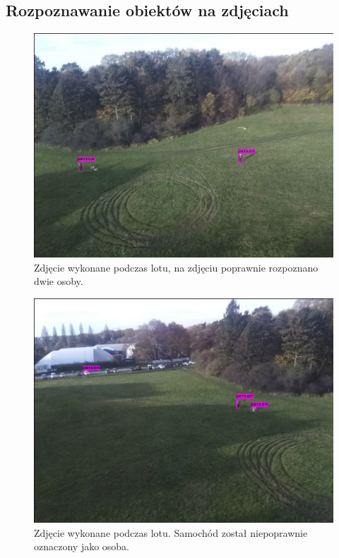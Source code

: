 \subsection{Rozpoznawanie obiektów na zdjęciach}
\begin{multicols}{2}
    
\begin{figure}[H]
	\centering
	\includegraphics[width=\linewidth]{rys05/correctly_recognised_2_ppl.jpg}
    \caption{
        Zdjęcie wykonane podczas lotu, na zdjęciu poprawnie rozpoznano dwie osoby.
    }
	\label{final_ai_good}
\end{figure}

\begin{figure}[H]
	\centering
	\includegraphics[width=\linewidth]{rys05/car_person.jpg}
    \caption{
        Zdjęcie wykonane podczas lotu. Samochód został niepoprawnie oznaczony jako osoba.
    }
	\label{final_ai_bad}
\end{figure}
\end{multicols}

